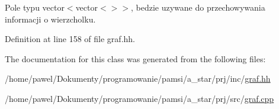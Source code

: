 Pole typu vector$<$vector$<$$>$$>$, bedzie uzywane do przechowywania informacji o wierzcholku. 



Definition at line 158 of file graf.\-hh.



The documentation for this class was generated from the following files\-:\begin{DoxyCompactItemize}
\item 
/home/pawel/\-Dokumenty/programowanie/pamsi/a\-\_\-star/prj/inc/\hyperlink{graf_8hh}{graf.\-hh}\item 
/home/pawel/\-Dokumenty/programowanie/pamsi/a\-\_\-star/prj/src/\hyperlink{graf_8cpp}{graf.\-cpp}\end{DoxyCompactItemize}
